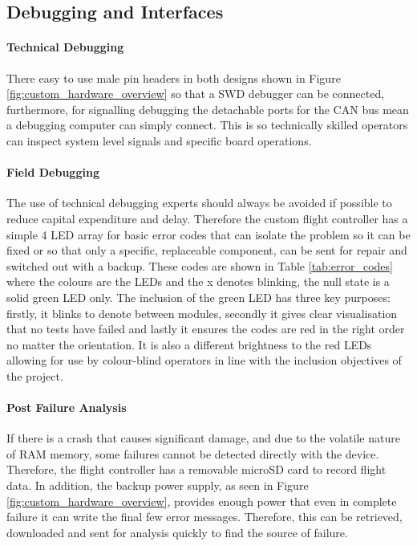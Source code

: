 \subsection{Debugging and Interfaces}\label{sub_sub_section:debugging}
\paragraph{Technical Debugging}
There easy to use male pin headers in both designs shown in Figure \ref{fig:custom_hardware_overview} so that a \gls{SWD} debugger can be connected, furthermore, for signalling debugging the detachable ports for the \gls{CAN} bus mean a debugging computer can simply connect. This is so technically skilled operators can inspect system level signals and specific board operations.
\paragraph{Field Debugging}
The use of technical debugging experts should always be avoided if possible to reduce capital expenditure and delay. Therefore the custom flight controller has a simple 4 \gls{LED} array for basic error codes that can isolate the problem so it can be fixed or so that only a specific, replaceable component, can be sent for repair and switched out with a backup. These codes are shown in Table \ref{tab:error_codes} where the colours are the \gls{LED}s and the x denotes blinking, the null state is a solid green \gls{LED} only.  The inclusion of the green LED has three key purposes: firstly, it blinks to denote between modules, secondly it gives clear visualisation that no tests have failed and lastly it ensures the codes are red in the right order no matter the orientation. It is also a different brightness to the red \gls{LED}s allowing for use by colour-blind operators in line with the inclusion objectives of the project.

\paragraph{Post Failure Analysis}
If there is a crash that causes significant damage, and due to the volatile nature of \gls{RAM} memory, some failures cannot be detected directly with the device. Therefore, the flight controller has a removable microSD card to record flight data. In addition, the backup power supply, as seen in Figure \ref{fig:custom_hardware_overview}, provides enough power that even in complete failure it can write the final few error messages. Therefore, this can be retrieved, downloaded and sent for analysis quickly to find the source of failure.
